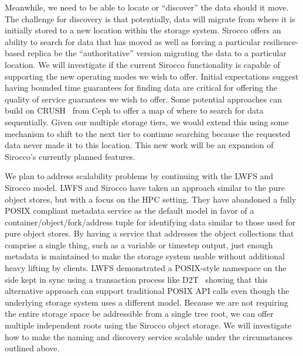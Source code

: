 Meanwhile, we need to be able to locate or ``discover'' the data should it
move.  The challenge for discovery is that potentially, data will migrate from
where it is initially stored to a new location within the storage system.
Sirocco offers an ability to search for data that has moved as well as forcing
a particular resilience-based replica be the ``authoritative'' version
migrating the data to a particular location. We will investigate if the current
Sirocco functionality is capable of supporting the new operating modes we wish
to offer. Initial expectations suggest having bounded time guarantees for
finding data are critical for offering the quality of service guarantees we
wish to offer. Some potential approaches can build on CRUSH~\cite{weil:ceph}
from Ceph to offer a map of where to search for data sequentially. Given our
multiple storage tiers, we would extend this using some mechanism to shift to
the next tier to continue searching because the requested data never made it to
this location. This new work will be an expansion of Sirocco's currently
planned features.

We plan to address scalability problems by continuing with the LWFS and Sirocco
model. LWFS and Sirocco have taken an approach similar to the pure object
stores, but with a focus on the HPC setting. They have abandoned a fully POSIX
compliant metadata service as the default model in favor of a
container/object/fork/address tuple for identifying data similar to those used
for pure object stores. By having a service that addresses the object
collections that comprise a single thing, such as a variable or timestep
output, just enough metadata is maintained to make the storage system usable
without additional heavy lifting by clients.  LWFS demonstrated a POSIX-style
namespace on the side kept in sync using a transaction process like
D2T~\cite{lofstead:2012:txn} showing that this alternative approach can support
traditional POSIX API calls even though the underlying storage system uses a
different model. Because we are not requiring the entire storage space be
addressible from a single tree root, we can offer multiple independent roots
using the Sirocco object storage. We will investigate how to make the naming
and discovery service scalable under the circumstances outlined above.

